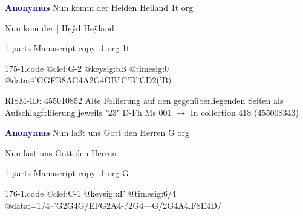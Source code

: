 \documentclass[twocolumn]{book}
\begin{document}
\newline \par \vspace{7pt} \textcolor{darkblue}{\textbf{Anonymus  }}
\newline Nun komm der Heiden Heiland  1t  
\newline org
\newline \begin{itshape}[f.23r, at left:] Nun kom der | Heÿd Heÿland\end{itshape} 
\newline \textcolor{darkblue}{}  1 parts  
\newline Manuscript copy
.1  org  1t  
\begin{filecontents*}{175-1.code}
@clef:G-2
@keysig:bB
@timesig:0
@data:4'GGFB{8AG}4A2G4GB''C'B''CD2('B)
\end{filecontents*}
\newline
%

\newline RISM-ID: 455010852
\newline Alte Foliierung auf den gegenüberliegenden Seiten als Aufschlagfoliierung jeweils "23"
\newline D-Fh  Ms 001
\newline $\rightarrow$ In collection 418 (455008343)

\newline \par \vspace{7pt} \textcolor{darkblue}{\textbf{Anonymus  }}
\newline Nun laßt uns Gott den Herren  G  
\newline org
\newline \begin{itshape}[f.107v, heading:] Nun last uns Gott den Herren\end{itshape} 
\newline \textcolor{darkblue}{}  1 parts  
\newline Manuscript copy
.1  org  G  
\begin{filecontents*}{176-1.code}
@clef:C-1
@keysig:xF
@timesig:6/4
@data:=1/4--'G2G4G/EFG2A4-/2G4---G/2G4A4.F8E4D/
\end{filecontents*}
\newline
%
\end{document}
